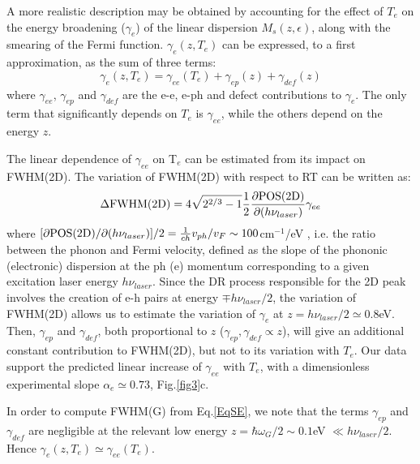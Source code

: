 \documentclass[aps, prl,twocolumn]{revtex4}
\begin{document}
A more realistic description may be obtained by accounting for the effect of $T_e$ on the energy broadening ($\gamma_e$) of the linear dispersion $M_s(z,\epsilon)$, along with the smearing of the Fermi function. $\gamma_{e}(z,T_e)$ can be expressed, to a first approximation, as the sum of three terms\cite{Venezuela2011}:
\begin{equation}
\gamma_e(z,T_e)=\gamma_{ee}(T_e)+\gamma_{ep}(z)+\gamma_{def}(z)
\label{eqgammae}
\end{equation}
where $\gamma_{ee}$, $\gamma_{ep}$ and $\gamma_{def}$ are the e-e, e-ph and defect contributions to $\gamma_e$. The only term that significantly depends on $T_e$ is $\gamma_{ee}$, while the others depend on the energy $z$\cite{Pisana2007,Pinczuk2007, Neumann2015,Bonini2007,Venezuela2011,BaskPRB2009}.

The linear dependence of $\gamma_{ee}$ on T$_e$\cite{Schutt2011} can be estimated from its impact on FWHM(2D). The variation of FWHM(2D) with respect to RT can be written as\cite{Basko2008}:
\begin{equation}
\Delta \textnormal{FWHM(2D)}=4\sqrt{2^{2/3}-1}\frac{1}{2}\frac{\partial \textnormal{POS}(\textnormal{2D})}{\partial (h\nu_{laser})} \gamma_{ee}
\label{eq:gamma2D}
\end{equation}
where $[{\partial \textnormal{POS}(\textnormal{2D})}/{\partial (h\nu_{laser})}]/2 =\frac{1}{c h} v_{ph}/v_F\sim100$cm$^{-1}$/eV \cite{Vidano1981,FerrariNN2013}, i.e. the ratio between the phonon and Fermi velocity, defined as the slope of the phononic (electronic) dispersion at the ph (e) momentum corresponding to a given excitation laser energy $h \nu_{laser}$\cite{FerrariNN2013}. Since the DR process responsible for the 2D peak involves the creation of e-h pairs at energy $\mp h\nu_{laser}/2$, the variation of FWHM(2D) allows us to estimate the variation of $\gamma_e$ at $z=h\nu_{laser}/2\simeq 0.8$eV. Then, $\gamma_{ep}$ and $\gamma_{def}$, both proportional to $z$ ($\gamma_{ep},\gamma_{def}\propto z$), will give an additional constant contribution to FWHM(2D), but not to its variation with $T_e$. Our data support the predicted\cite{Schutt2011} linear increase of $\gamma_{ee}$ with $T_e$, with a dimensionless experimental slope $\alpha_e\simeq 0.73$, Fig.\ref{fig3}c.

In order to compute FWHM(G) from Eq.\ref{EqSE}, we note that the terms $\gamma_{ep}$ and $\gamma_{def}$ are negligible at the relevant low energy $z=\hbar\omega_G/2\sim0.1$eV $\ll  h\nu_{laser}/2$. Hence $\gamma_e(z,T_e)\simeq \gamma_{ee}(T_e)$.
\end{document}
